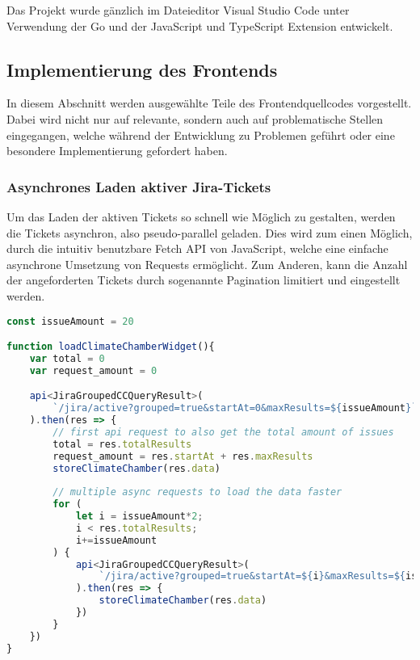 Das Projekt wurde gänzlich im Dateieditor Visual Studio Code
unter Verwendung der Go und der JavaScript und TypeScript Extension entwickelt.

\subsection{Implementierung des Frontends}
In diesem Abschnitt werden ausgewählte Teile des Frontendquellcodes vorgestellt.
Dabei wird nicht nur auf relevante, sondern auch auf problematische Stellen eingegangen,
welche während der Entwicklung zu Problemen geführt oder eine besondere 
Implementierung gefordert haben.

\subsubsection{Asynchrones Laden aktiver Jira-Tickets}
Um das Laden der aktiven Tickets so schnell wie Möglich zu gestalten, werden die
Tickets asynchron, also pseudo-parallel geladen. Dies wird zum einen Möglich, durch
die intuitiv benutzbare Fetch API
von JavaScript, welche eine einfache asynchrone Umsetzung von Requests ermöglicht.
Zum Anderen, kann die Anzahl der angeforderten Tickets durch sogenannte Pagination
limitiert und eingestellt werden. 

\begin{lstlisting}[caption=TypeScript Funktion zum asynchronen Laden aktiver Tickets (\textit{frontend/src/ts/dashboard.ts}),language=TypeScript]
const issueAmount = 20

function loadClimateChamberWidget(){
    var total = 0
    var request_amount = 0

    api<JiraGroupedCCQueryResult>(
        `/jira/active?grouped=true&startAt=0&maxResults=${issueAmount}`
    ).then(res => {
        // first api request to also get the total amount of issues
        total = res.totalResults
        request_amount = res.startAt + res.maxResults
        storeClimateChamber(res.data)
        
        // multiple async requests to load the data faster
        for (
            let i = issueAmount*2;
            i < res.totalResults;
            i+=issueAmount
        ) {
            api<JiraGroupedCCQueryResult>(
                `/jira/active?grouped=true&startAt=${i}&maxResults=${issueAmount}`
            ).then(res => {
                storeClimateChamber(res.data)
            })
        }
    })  
}
\end{lstlisting}

